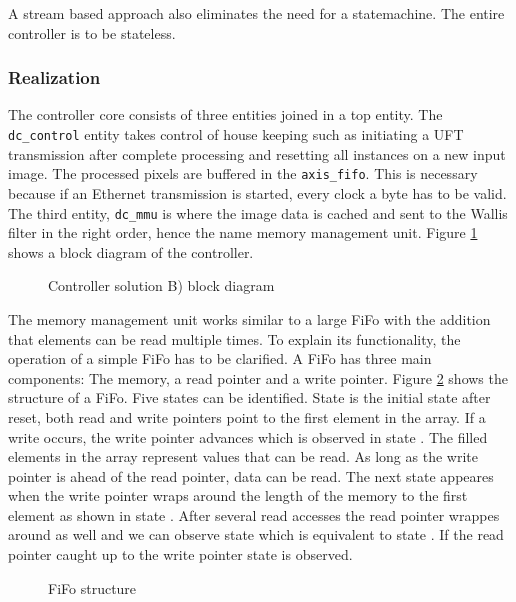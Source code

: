 A stream based approach also eliminates the need for a statemachine. The entire
controller is to be stateless.

\subsubsection*{Realization}
The controller core consists of three entities joined in a top entity. The 
\texttt{dc\_control} entity takes control of house keeping such as initiating a
UFT transmission after complete processing and resetting all instances on a new
input image. The processed pixels are buffered in the \texttt{axis\_fifo}. This
is necessary because if an Ethernet transmission is started, every clock a byte
has to be valid. The third entity, \texttt{dc\_mmu} is where the image data is
cached and sent to the Wallis filter in the right order, hence the name memory
management unit. Figure \ref{fig:dctop} shows a block diagram of the controller.

\begin{figure}[b!]
    \centering
    \begin{adjustbox}{max width=1\textwidth}
        
    \end{adjustbox}
    \caption{Controller solution B) block diagram}
    \label{fig:dctop}
\end{figure}

The memory management unit works similar to a large FiFo with the addition that
elements can be read multiple times. To explain its functionality, the operation
of a simple FiFo has to be clarified. A FiFo has three main components: The
memory, a read pointer and a write pointer. Figure \ref{fig:fifo} shows the
structure of a FiFo. Five states can be identified. State  is the initial
state after reset, both read and write pointers point to the first element in
the array. If a write occurs, the write pointer advances which is observed in
state . The filled elements in the array represent values that can be
read. As long as the write pointer is ahead of the read pointer, data can be
read. The next state appeares when the write pointer wraps around the length of
the memory to the first element as shown in state . After several read
accesses the read pointer wrappes around as well and we can observe state 
 which is equivalent to state . If the read pointer caught up to
the write pointer state  is observed.

\begin{figure}[tb!]
    \centering
    \begin{adjustbox}{max width=\textwidth}
        
    \end{adjustbox}
    \caption{FiFo structure}
    \label{fig:fifo}
\end{figure}

